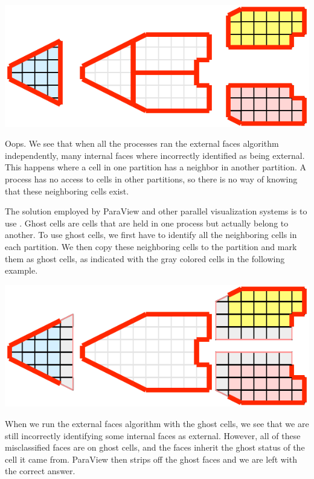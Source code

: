 \begin{inlinefig}
  \includegraphics{images/ParallelExampleExternalFaces1}
\end{inlinefig}

Oops.  We see that when all the processes ran the external faces algorithm
independently, many internal faces where incorrectly identified as being
external.  This happens where a cell in one partition has a neighbor in
another partition.  A process has no access to cells in other partitions,
so there is no way of knowing that these neighboring cells exist.

The solution employed by ParaView and other parallel visualization systems
is to use .  Ghost cells are cells that are held in
one process but actually belong to another.  To use ghost cells, we first
have to identify all the neighboring cells in each partition.  We then copy
these neighboring cells to the partition and mark them as ghost cells, as
indicated with the gray colored cells in the following example.

\begin{inlinefig}
  \includegraphics{images/ParallelExampleExternalFaces2}
\end{inlinefig}

When we run the external faces algorithm with the ghost cells, we see that
we are still incorrectly identifying some internal faces as external.
However, all of these misclassified faces are on ghost cells, and the faces
inherit the ghost status of the cell it came from.  ParaView then strips
off the ghost faces and we are left with the correct answer.

